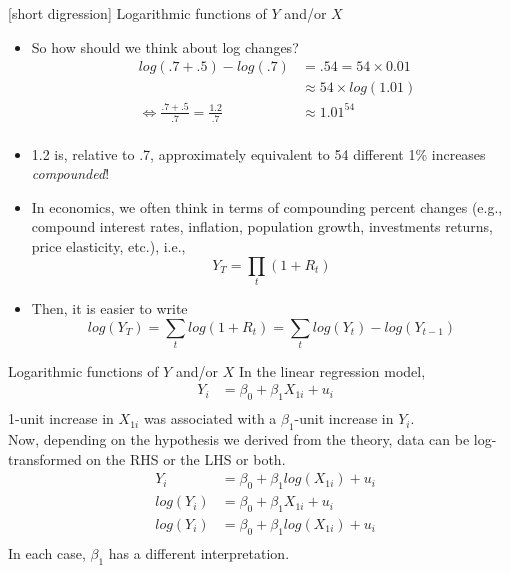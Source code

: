 \documentclass[notes,10pt, aspectratio=169]{beamer}
\begin{document}
\begin{frame}{[short digression] Logarithmic functions of $Y$ and/or $X$}
\begin{itemize}
    \item So how should we think about log changes? 
        \begin{eqnarray*}
            &log(.7+.5)- log(.7) &= .54 =54\times0.01\\
            & {} &\approx 54\times log(1.01) \\
            &\Leftrightarrow \frac{.7+.5}{.7}= \frac{1.2}{.7}&\approx 1.01^{54}           \\
        \end{eqnarray*}
    \item 1.2 is, relative to .7, approximately equivalent to 54 different 1\% increases \textit{compounded}!\\[1em]
    \item In economics, we often think in terms of compounding percent changes (e.g., compound interest rates, inflation, population growth, investments returns, price elasticity, etc.), i.e.,
    \begin{equation*}
        Y_T = \prod_t (1+R_t)
    \end{equation*}
    \item Then, it is easier to write
        \begin{equation*}
        log(Y_T) = \sum_t log(1+R_t)= \sum_t log(Y_t) - log(Y_{t-1})
    \end{equation*}
\end{itemize}
\end{frame}


\begin{frame}{Logarithmic functions of $Y$ and/or $X$}
In the linear regression model,
\begin{eqnarray*}
    &Y_i &= \beta_0 + \beta_1 X_{1i} + u_i\\
\end{eqnarray*}
1-unit increase in $X_{1i}$ was associated with a $\beta_1$-unit increase in $Y_i$.\\[1em] 

Now, depending on the hypothesis we derived from the theory, data can be log-transformed on the RHS or the LHS or both.\\

\begin{eqnarray*}
    &Y_i &= \beta_0 + \beta_1 log(X_{1i}) + u_i\\
    &log(Y_i) &= \beta_0 + \beta_1 X_{1i} + u_i\\
    &log(Y_i) &= \beta_0 + \beta_1 log(X_{1i}) + u_i\\
\end{eqnarray*}
In each case, $\beta_1$ has a different interpretation.
\end{frame}
\end{document}
